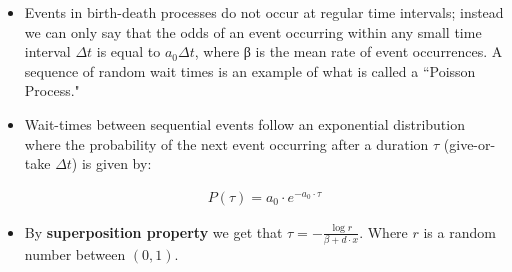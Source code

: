 \documentclass[10pt, usenames, dvipsnames, xcolor=table]{beamer}
\begin{document}
\begin{frame}
\begin{itemize}
\item Events in birth-death processes do not occur at regular time intervals; instead we can only say that the odds of an event occurring within any small time interval $\Delta t$ is equal to $a_{0} \Delta t$, where β is the mean rate of event occurrences. A sequence of random wait times is an example of what is called a ``Poisson Process."

\item Wait-times between sequential events follow an exponential distribution where the probability of the next event occurring after a duration $\tau$ (give-or-take $\Delta t$) is given by:

\begin{align*}
P(\tau) = a_{0} \cdot e^{-a_0 \cdot \tau}
\end{align*}

\item By \textbf{superposition property} we get that $\tau = - \frac{\log{r}}{\beta + d\cdot x}$. Where $r$ is a random number between $(0,1)$.
\end{itemize}
\end{frame}
\end{document}
